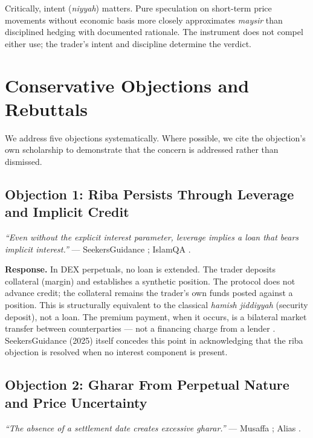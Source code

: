 \documentclass[10pt,twocolumn]{article}
\begin{document}
Critically, intent (\textit{niyyah}) matters. Pure speculation on short-term
price movements without economic basis more closely approximates \textit{maysir}
than disciplined hedging with documented rationale. The instrument does not
compel either use; the trader's intent and discipline determine the verdict.

\section{Conservative Objections and Rebuttals}
\label{sec:objections}

We address five objections systematically. Where possible, we cite the
objection's own scholarship to demonstrate that the concern is addressed rather
than dismissed.

\subsection{Objection 1: Riba Persists Through Leverage and Implicit Credit}

\emph{``Even without the explicit interest parameter, leverage implies a loan
that bears implicit interest.''} --- SeekersGuidance \cite{SeekersGuidance2025};
IslamQA \cite{IslamQA2023}.

\textbf{Response.} In DEX perpetuals, no loan is extended. The trader deposits
collateral (margin) and establishes a synthetic position. The protocol does not
advance credit; the collateral remains the trader's own funds posted against
a position. This is structurally equivalent to the classical \textit{hamish
jiddiyyah} (security deposit), not a loan. The premium payment, when it occurs,
is a bilateral market transfer between counterparties --- not a financing charge
from a lender \cite{SoleJobst2012,Malkawi2014}. SeekersGuidance (2025) itself
concedes this point in acknowledging that the riba objection is resolved when
no interest component is present.

\subsection{Objection 2: Gharar From Perpetual Nature and Price Uncertainty}

\emph{``The absence of a settlement date creates excessive gharar.''} ---
Musaffa \cite{Musaffa2024}; Alias \cite{Alias2015}.
\end{document}

